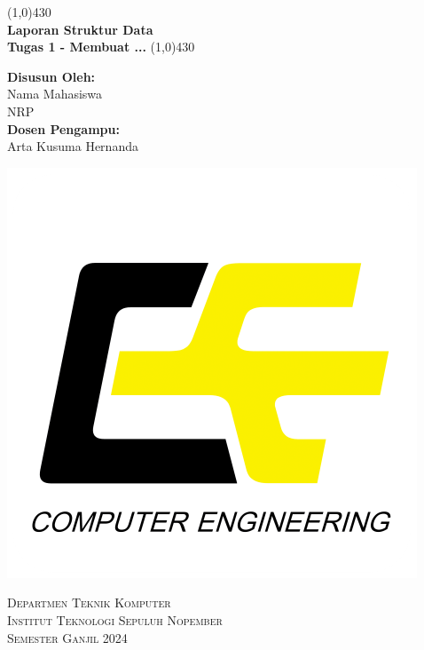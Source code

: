 \begin{titlepage}


\begin{center}
\line(1,0){430}\\

{\Huge \bf \vspace{.5em}Laporan \vspace{.5em} Struktur Data \\ Tugas 1 - Membuat ...}
\line(1,0){430}

\end{center}

\vfill


\vfill
\begin{center}
{\large \bf Disusun Oleh:}\\ Nama Mahasiswa \\ NRP \\
{\large \bf Dosen Pengampu:}\\ Arta Kusuma Hernanda
\end{center}


\vfill


\vfill
	
\begin{center}
\includegraphics[scale=0.035]{./ce-logo}
\end{center}

\begin{center}
	\textsc{Departmen Teknik Komputer \\
		Institut Teknologi Sepuluh Nopember \\
  Semester Ganjil 2024 }
\end{center}



\end{titlepage}

